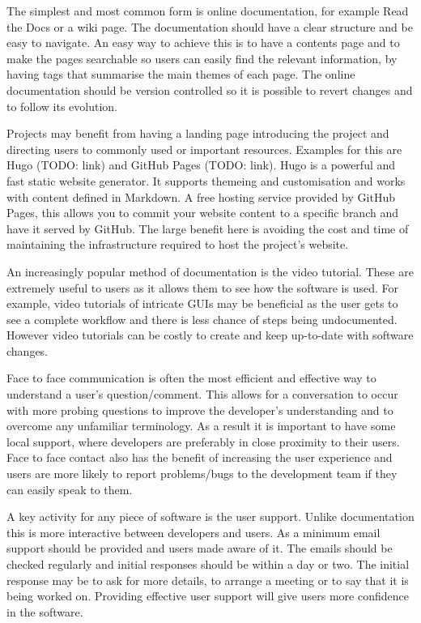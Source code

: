 \documentclass[jnr]{iosart2x}
\begin{document}
The simplest and most common form is online documentation, for example Read the Docs \cite{Read_The_Docs} or a wiki page.
The documentation should have a clear structure and be easy to navigate.
An easy way to achieve this is to have a contents page and to make the pages searchable so users can easily find the relevant information, by having tags that summarise the main themes of each page.
The online documentation should be version controlled so it is possible to revert changes and to follow its evolution.

Projects may benefit from having a landing page introducing the project and directing users to commonly used or important resources.
Examples for this are Hugo (TODO: link) and GitHub Pages (TODO: link).
Hugo is a powerful and fast static website generator.
It supports themeing and customisation and works with content defined in Markdown.
A free hosting service provided by GitHub Pages, this allows you to commit your website content to a specific branch and have it served by GitHub.
The large benefit here is avoiding the cost and time of maintaining the infrastructure required to host the project's website.

An increasingly popular method of documentation is the video tutorial.
These are extremely useful to users as it allows them to see how the software is used.
For example, video tutorials of intricate GUIs may be beneficial as the user gets to see a complete workflow and there is less chance of steps being undocumented.
However video tutorials can be costly to create and keep up-to-date with software changes.

Face to face communication is often the most efficient and effective way to understand a user's question/comment.
This allows for a conversation to occur with more probing questions to improve the developer's understanding and to overcome any unfamiliar terminology.
As a result it is important to have some local support, where developers are preferably in close proximity to their users.
Face to face contact also has the benefit of increasing the user experience and users are more likely to report problems/bugs to the development team if they can easily speak to them.

A key activity for any piece of software is the user support.
Unlike documentation this is more interactive between developers and users.
As a minimum email support should be provided and users made aware of it.
The emails should be checked regularly and initial responses should be within a day or two.
The initial response may be to ask for more details, to arrange a meeting or to say that it is being worked on.
Providing effective user support will give users more confidence in the software.
\end{document}
